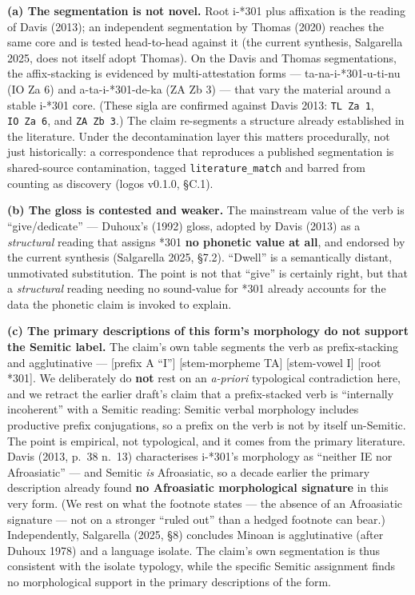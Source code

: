\documentclass[
  10pt,
]{article}
\begin{document}
\textbf{(a) The segmentation is not novel.} Root i-*301 plus affixation
is the reading of Davis (2013); an independent segmentation by Thomas
(2020) reaches the same core and is tested head-to-head against it (the
current synthesis, Salgarella 2025, does not itself adopt Thomas). On
the Davis and Thomas segmentations, the affix-stacking is evidenced by
multi-attestation forms --- ta-na-i-*301-u-ti-nu (IO Za 6) and
a-ta-i-*301-de-ka (ZA Zb 3) --- that vary the material around a stable
i-*301 core. (These sigla are confirmed against Davis 2013:
\texttt{TL\ Za\ 1}, \texttt{IO\ Za\ 6}, and \texttt{ZA\ Zb\ 3}.) The
claim re-segments a structure already established in the literature.
Under the decontamination layer this matters procedurally, not just
historically: a correspondence that reproduces a published segmentation
is shared-source contamination, tagged \texttt{literature\_match} and
barred from counting as discovery (logos v0.1.0, §C.1).

\textbf{(b) The gloss is contested and weaker.} The mainstream value of
the verb is ``give/dedicate'' --- Duhoux's (1992) gloss, adopted by
Davis (2013) as a \emph{structural} reading that assigns *301 \textbf{no
phonetic value at all}, and endorsed by the current synthesis
(Salgarella 2025, §7.2). ``Dwell'' is a semantically distant,
unmotivated substitution. The point is not that ``give'' is certainly
right, but that a \emph{structural} reading needing no sound-value for
*301 already accounts for the data the phonetic claim is invoked to
explain.

\textbf{(c) The primary descriptions of this form's morphology do not
support the Semitic label.} The claim's own table segments the verb as
prefix-stacking and agglutinative --- {[}prefix A ``I''{]}
{[}stem-morpheme TA{]} {[}stem-vowel I{]} {[}root *301{]}. We
deliberately do \textbf{not} rest on an \emph{a-priori} typological
contradiction here, and we retract the earlier draft's claim that a
prefix-stacked verb is ``internally incoherent'' with a Semitic reading:
Semitic verbal morphology includes productive prefix conjugations, so a
prefix on the verb is not by itself un-Semitic. The point is empirical,
not typological, and it comes from the primary literature. Davis (2013,
p.~38 n.~13) characterises i-*301's morphology as ``neither IE nor
Afroasiatic'' --- and Semitic \emph{is} Afroasiatic, so a decade earlier
the primary description already found \textbf{no Afroasiatic
morphological signature} in this very form. (We rest on what the
footnote states --- the absence of an Afroasiatic signature --- not on a
stronger ``ruled out'' than a hedged footnote can bear.) Independently,
Salgarella (2025, §8) concludes Minoan is agglutinative (after Duhoux
1978) and a language isolate. The claim's own segmentation is thus
consistent with the isolate typology, while the specific Semitic
assignment finds no morphological support in the primary descriptions of
the form.
\end{document}
